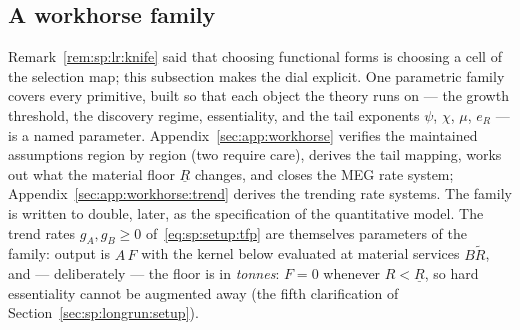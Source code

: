 \subsection{A workhorse family}\label{sec:sp:longrun:workhorse}

Remark~\ref{rem:sp:lr:knife} said that choosing functional forms is choosing a cell of the
selection map; this subsection makes the dial explicit. One parametric family covers every
primitive, built so that each object the theory runs on --- the growth threshold, the
discovery regime, essentiality, and the tail exponents $\psi$, $\chi$, $\mu$, $e_R$ --- is a
named parameter. Appendix~\ref{sec:app:workhorse} verifies the maintained assumptions region by
region (two require care), derives the tail mapping, works out what the material floor
$\underline R$ changes, and closes the MEG rate system;
Appendix~\ref{sec:app:workhorse:trend} derives the trending rate systems. The family is
written to double, later, as the specification of the quantitative model. The trend rates
$g_A,g_B\ge0$ of~\eqref{eq:sp:setup:tfp} are themselves parameters of the family: output is
$A\,F$ with the kernel below evaluated at material services $B\tilde R$, and --- deliberately
--- the floor is in \emph{tonnes}: $F=0$ whenever $R<\underline R$, so hard essentiality
cannot be augmented away (the fifth clarification of Section~\ref{sec:sp:longrun:setup}).

